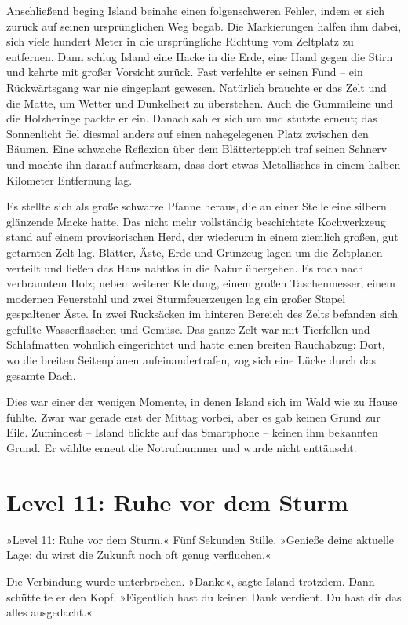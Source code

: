 Anschließend beging Island beinahe einen folgenschweren Fehler, indem er sich zurück auf seinen ursprünglichen Weg begab. Die Markierungen halfen ihm dabei, sich viele hundert Meter in die ursprüngliche Richtung vom Zeltplatz zu entfernen. Dann schlug Island eine Hacke in die Erde, eine Hand gegen die Stirn und kehrte mit großer Vorsicht zurück. Fast verfehlte er seinen Fund – ein Rückwärtsgang war nie eingeplant gewesen. Natürlich brauchte er das Zelt und die Matte, um Wetter und Dunkelheit zu überstehen. Auch die Gummileine und die Holzheringe packte er ein. Danach sah er sich um und stutzte erneut; das Sonnenlicht fiel diesmal anders auf einen nahegelegenen Platz zwischen den Bäumen. Eine schwache Reflexion über dem Blätterteppich traf seinen Sehnerv und machte ihn darauf aufmerksam, dass dort etwas Metallisches in einem halben Kilometer Entfernung lag.

Es stellte sich als große schwarze Pfanne heraus, die an einer Stelle eine silbern glänzende Macke hatte. Das nicht mehr vollständig beschichtete Kochwerkzeug stand auf einem provisorischen Herd, der wiederum in einem ziemlich großen, gut getarnten Zelt lag. Blätter, Äste, Erde und Grünzeug lagen um die Zeltplanen verteilt und ließen das Haus nahtlos in die Natur übergehen. Es roch nach verbranntem Holz; neben weiterer Kleidung, einem großen Taschenmesser, einem modernen Feuerstahl und zwei Sturmfeuerzeugen lag ein großer Stapel gespaltener Äste. In zwei Rucksäcken im hinteren Bereich des Zelts befanden sich gefüllte Wasserflaschen und Gemüse. Das ganze Zelt war mit Tierfellen und Schlafmatten wohnlich eingerichtet und hatte einen breiten Rauchabzug: Dort, wo die breiten Seitenplanen aufeinandertrafen, zog sich eine Lücke durch das gesamte Dach.

Dies war einer der wenigen Momente, in denen Island sich im Wald wie zu Hause fühlte. Zwar war gerade erst der Mittag vorbei, aber es gab keinen Grund zur Eile. Zumindest – Island blickte auf das Smartphone – keinen ihm bekannten Grund. Er wählte erneut die Notrufnummer und wurde nicht enttäuscht.

\section{Level 11: Ruhe vor dem Sturm}

»Level 11: Ruhe vor dem Sturm.« Fünf Sekunden Stille. »Genieße deine aktuelle Lage; du wirst die Zukunft noch oft genug verfluchen.«

Die Verbindung wurde unterbrochen. »Danke«, sagte Island trotzdem. Dann schüttelte er den Kopf. »Eigentlich hast du keinen Dank verdient. Du hast dir das alles ausgedacht.«


